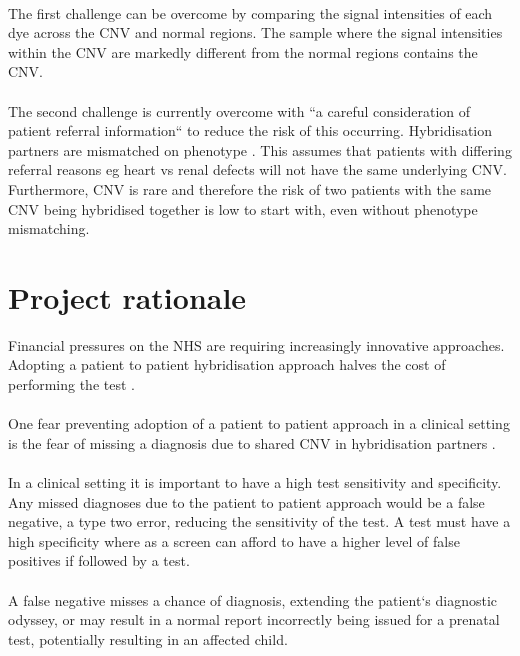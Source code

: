 \paragraph*{}
The first challenge can be overcome by comparing the signal intensities of each dye across the CNV and normal regions. The sample where the signal intensities within the CNV are markedly different from the normal regions contains the CNV.

\paragraph*{}
The second challenge is currently overcome with ``a careful consideration of patient referral information`` to reduce the risk of this occurring. Hybridisation partners are mismatched on phenotype \cite{ahn2010}. This assumes that patients with differing referral reasons eg heart vs renal defects will not have the same underlying CNV. Furthermore, CNV is rare and therefore the risk of two patients with the same CNV being hybridised together is low to start with, even without phenotype mismatching.

\section{Project rationale}
Financial pressures on the NHS are requiring increasingly innovative approaches. Adopting a patient to patient hybridisation approach halves the cost of performing the test \cite{ahn2010}.
\paragraph*{}
One fear preventing adoption of a patient to patient approach in a clinical setting is the fear of missing a diagnosis due to shared CNV in hybridisation partners \cite{dunlop2015}. 
\paragraph*{}
In a clinical setting it is important to have a high test sensitivity and specificity. Any missed diagnoses due to the patient to patient approach would be a false negative, a type two error, reducing the sensitivity of the test.  A test must have a high specificity where as a screen can afford to have a higher level of false positives if followed by a test.
\paragraph*{}
A false negative misses a chance of diagnosis, extending the patient`s diagnostic odyssey, or may result in a normal report incorrectly being issued for a prenatal test, potentially resulting in an affected child. 
